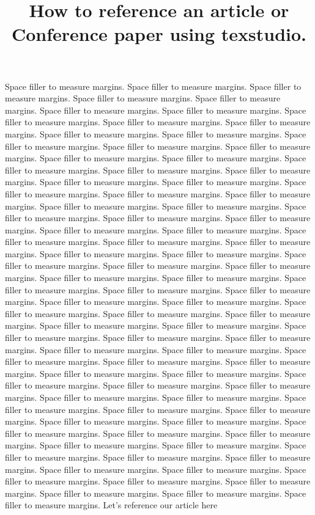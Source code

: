 \documentclass[conference]{IEEEtran}
\begin{document}
	
	\title{How to reference an article or Conference paper using texstudio.}
	
	\maketitle
	
	Space filler to measure margins. Space filler to measure margins. Space filler to measure margins. Space filler to measure margins. Space filler to measure margins. Space filler to measure margins. Space filler to measure margins. Space filler to measure margins. Space filler to measure margins. Space filler to measure margins. Space filler to measure margins. Space filler to measure margins. Space filler to measure margins. Space filler to measure margins. Space filler to measure margins. Space filler to measure margins. Space filler to measure margins. Space filler to measure margins. Space filler to measure margins. Space filler to measure margins. Space filler to measure margins. Space filler to measure margins. Space filler to measure margins. Space filler to measure margins. Space filler to measure margins. Space filler to measure margins. Space filler to measure margins. Space filler to measure margins. Space filler to measure margins. Space filler to measure margins. Space filler to measure margins. Space filler to measure margins. Space filler to measure margins. Space filler to measure margins. Space filler to measure margins. Space filler to measure margins. Space filler to measure margins. Space filler to measure margins. Space filler to measure margins. Space filler to measure margins. Space filler to measure margins. Space filler to measure margins. Space filler to measure margins. Space filler to measure margins. Space filler to measure margins. Space filler to measure margins. Space filler to measure margins. Space filler to measure margins. Space filler to measure margins. Space filler to measure margins. Space filler to measure margins. Space filler to measure margins. Space filler to measure margins. Space filler to measure margins. Space filler to measure margins. Space filler to measure margins. Space filler to measure margins. Space filler to measure margins. Space filler to measure margins. Space filler to measure margins. Space filler to measure margins. Space filler to measure margins. Space filler to measure margins. Space filler to measure margins. Space filler to measure margins. Space filler to measure margins. Space filler to measure margins. Space filler to measure margins. Space filler to measure margins. Space filler to measure margins. Space filler to measure margins. Space filler to measure margins.  Space filler to measure margins. Space filler to measure margins. Space filler to measure margins. Space filler to measure margins. Space filler to measure margins. Space filler to measure margins. Space filler to measure margins. Space filler to measure margins. Space filler to measure margins. Space filler to measure margins. Space filler to measure margins. Space filler to measure margins. Space filler to measure margins. Space filler to measure margins. Space filler to measure margins. Space filler to measure margins. 
	Let's reference our article here \cite{raymond1997cathedral}
	
	
	
	
\end{document}
